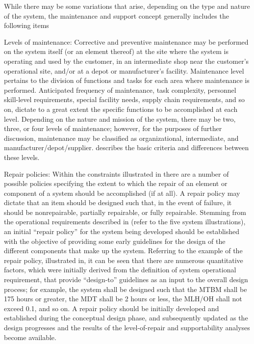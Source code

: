 While there may be some variations that arise, depending on the type and nature of the system, the maintenance and support concept generally includes the following items

Levels of maintenance: Corrective and preventive maintenance may be performed on the system itself (or an element thereof) at the site where the system is operating and used by the customer, in an intermediate shop near the customer’s operational site, and/or at a depot or manufacturer’s facility. Maintenance level pertains to the division of functions and tasks for each area where maintenance is performed. Anticipated frequency of maintenance, task complexity, personnel skill-level requirements, special facility needs, supply chain requirements, and so on, dictate to a great extent the specific functions to be accomplished at each level. Depending on the nature and mission of the system, there may be two, three, or four levels of maintenance; however, for the purposes of further discussion, maintenance may be classified as organizational, intermediate, and manufacturer/depot/supplier. 
describes the basic criteria and differences between these levels.

Repair policies: Within the constraints illustrated in there are a number of possible policies specifying the extent to which the repair of an element or component of a system should be accomplished (if at all). A repair policy may dictate that an item should be designed such that, in the event of failure, it should be nonrepairable, partially repairable, or fully repairable. Stemming from the operational requirements described in (refer to the five system illustrations), an initial ``repair policy'' for the system being developed should be established with the objective of providing some early guidelines for the design of the different components that make up the system. Referring to the example of the repair policy, illustrated in, it can be seen that there are numerous quantitative factors, which were initially derived from the definition of system operational requirement, that provide ``design-to'' guidelines as an input to the overall design process; for example, the system shall be designed such that the MTBM shall be 175 hours or greater, the MDT shall be 2 hours or less, the MLH/OH shall not exceed 0.1, and so on. A repair policy should be initially developed and established during the conceptual design phase, and subsequently updated as the design progresses and the results of the level-of-repair and supportability analyses become available.

